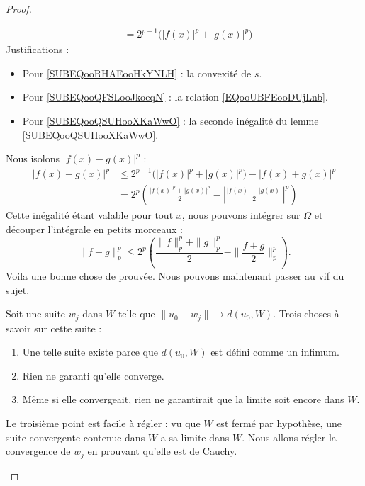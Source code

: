 \begin{proof}
\begin{subproof}
\begin{subequations}
\begin{align}
                    &=2^{p-1}\big( | f(x) |^p+| g(x) |^p \big)    
                \end{align}
            \end{subequations} 
            Justifications : 
            \begin{itemize}
                \item Pour \eqref{SUBEQooRHAEooHkYNLH} : la convexité de \( s\).
                \item Pour \eqref{SUBEQooQFSLooJkoeqN} : la relation \eqref{EQooUBFEooDUjLnb}.
                \item Pour \eqref{SUBEQooQSUHooXKaWwO} : la seconde inégalité du lemme \ref{SUBEQooQSUHooXKaWwO}.
            \end{itemize}
            Nous isolons \( | f(x)-g(x) |^p\) :
            \begin{subequations}
                \begin{align}
                    | f(x)-g(x) |^p&\leq 2^{p-1}\big( | f(x) |^p+| g(x) |^p \big)-| f(x)+g(x) |^p\\
                    &=2^p\left( \frac{ | f(x) |^p+| g(x) |^p }{2}-\left| \frac{ | f(x) |+| g(x) | }{2} \right|^p \right)
                \end{align}
            \end{subequations}
            Cette inégalité étant valable pour tout \( x\), nous pouvons intégrer sur \( \Omega\) et découper l'intégrale en petits morceaux :
            \begin{equation}        \label{EQooVNHSooPXjFNC}
                \| f-g \|^p_p\leq 2^p\left( \frac{ \| f \|_p^p+\| g \|_p^p }{2}- \| \frac{ f+g }{2} \|_p^p \right).
            \end{equation}
            Voila une bonne chose de prouvée. Nous pouvons maintenant passer au vif du sujet.

            Soit une suite \( w_j\) dans \( W\) telle que \( \| u_0-w_j \|\to d(u_0,W)\). Trois choses à savoir sur cette suite :
            \begin{enumerate}
                \item
                    Une telle suite existe parce que \( d(u_0,W)\) est défini comme un infimum.
                \item
                    Rien ne garanti qu'elle converge.
                \item
                    Même si elle convergeait, rien ne garantirait que la limite soit encore dans \( W\).
            \end{enumerate}
            Le troisième point est facile à régler : vu que \( W\) est fermé par hypothèse, une suite convergente contenue dans \( W\) a sa limite dans \( W\). Nous allons régler la convergence de \( w_j\) en prouvant qu'elle est de Cauchy.
            

\end{subproof}
\end{proof}
